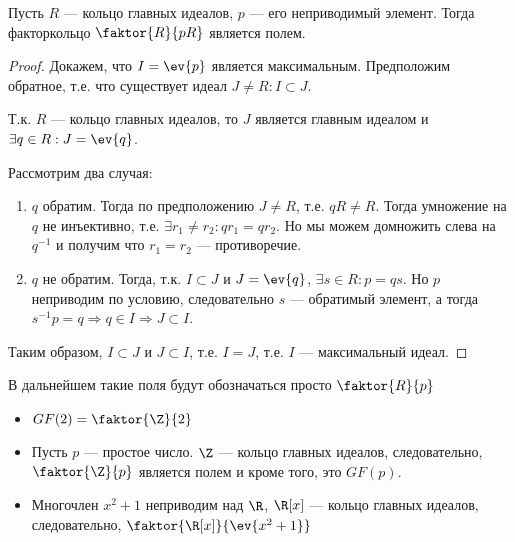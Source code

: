\begin{theorem}
    Пусть \(R\) --- кольцо главных идеалов, \(p\) --- его неприводимый элемент.
    Тогда факторкольцо \(\faktor{R}{pR}\) является полем.
\end{theorem}
\begin{proof}
    Докажем, что \(I = \ev{p}\) является максимальным.
    Предположим обратное, т.е. что существует идеал \(J \neq R : I \subset J\).
    
    Т.к. \(R\) --- кольцо главных идеалов, то \(J\) является главным идеалом
    и \(\exists q \in R : J = \ev{q}\).
    
    Рассмотрим два случая:
    \begin{enumerate}
        \item \(q\) обратим. Тогда по предположению \(J \neq R\), т.е. \(qR \neq R\).
        Тогда умножение на \(q\) не инъективно, т.е. \(\exists r_1 \neq r_2 : qr_1 = qr_2\).
        Но мы можем домножить слева на \(q^{-1}\) и получим что \(r_1 = r_2\)
        --- противоречие.
        \item \(q\) не обратим. Тогда, т.к. \(I \subset J\) и \(J = \ev{q}\),
        \(\exists s \in R : p = qs\). Но \(p\) неприводим по условию, следовательно
        \(s\) --- обратимый элемент, а тогда \(s^{-1}p = q \Rightarrow q \in I \Rightarrow
        J \subset I\).
    \end{enumerate}
    
    Таким образом, \(I \subset J\) и \(J \subset I\), т.е. \(I = J\),
    т.е. \(I\) --- максимальный идеал.
\end{proof}

В дальнейшем такие поля будут обозначаться просто \(\faktor{R}{p}\)

\begin{example}\itemfix
    \begin{itemize}
        \item \(GF(2) = \faktor{\Z}{2}\)
        \item Пусть \(p\) --- простое число. \(\Z\) --- кольцо главных идеалов,
        следовательно, \(\faktor{\Z}{p}\) является полем
        и кроме того, это \(GF(p)\).
        \item Многочлен \(x^2 + 1\) неприводим над \(\R\), \(\R[x]\) --- кольцо
        главных идеалов, следовательно, \(\faktor{\R[x]}{\ev{x^2 + 1}}\)
        \unfinished
    \end{itemize}
\end{example}

\unfinished

